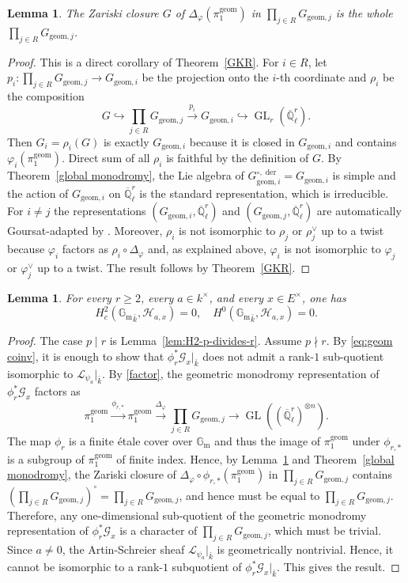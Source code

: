 \documentclass[11pt]{amsart}
\newtheorem{lemma}[theorem]{Lemma}
\theoremstyle{remark}
\newcommand{\Gm}{\mathbb G_{\mathrm m}}
\newcommand{\Ql}{\overline{\mathbb Q}_{\ell}}
\newcommand{\cL}{\mathcal L}
\newcommand{\cG}{\mathcal G}
\newcommand{\cH}{\mathcal H}
\newcommand{\geom}{\mathrm{geom}}
\def\GL{\operatorname{GL}}
\def\der{\operatorname{der}}
\begin{document}
\begin{lemma}\label{zariski closure}
The Zariski closure $G$ of $\Delta_\varphi(\pi_1^{\geom})$ in $\prod_{j\in R}G_{\geom,j}$ is the whole $\prod_{j\in R}G_{\geom,j}$.
\end{lemma}
\begin{proof}
This is a direct corollary of Theorem~\ref{GKR}. For $i\in R$, let $p_i:\prod_{j\in R}G_{\geom,j}\rightarrow G_{\geom,i}$ be the projection onto the $i$-th coordinate and $\rho_i$ be the composition
\[
G\hookrightarrow\prod_{j\in R}G_{\geom,j}\xrightarrow{p_i}G_{\geom,i}\hookrightarrow\GL_r(\Ql^r).
\]
Then $G_i=\rho_i(G)$ is exactly $G_{\geom,i}$ because it is closed in $G_{\geom,i}$ and contains $\varphi_i(\pi_1^{\geom})$. Direct sum of all $\rho_i$ is faithful by the definition of $G$. By Theorem~\ref{global monodromy}, the Lie algebra of $G_{\geom,i}^{\circ,\der}=G_{\geom,i}$ is simple and the action of $G_{\geom,i}$ on $\Ql^r$ is the standard representation, which is irreducible. For $i\ne j$ the representations $(G_{\geom,i},\Ql^r)$ and $(G_{\geom,j},\Ql^r)$ are automatically Goursat-adapted by \cite[Examples 1.8.1]{KatzESDE}. Moreover, $\rho_i$ is not isomorphic to $\rho_j$ or $\rho_j^\vee$ up to a twist because $\varphi_i$ factors as $\rho_i\circ\Delta_\varphi$ and, as explained above, $\varphi_i$ is not isomorphic to $\varphi_j$ or $\varphi_j^\vee$ up to a twist. The result follows by Theorem~\ref{GKR}. 
\end{proof}

\begin{lemma}\label{lem:H2-vanish}
For every $r\ge 2$, every $a\in k^{\times}$, and every $x\in E^{\times}$, one has
\[
H_c^2({\Gm}_{\bar{k}},\cH_{a,x})=0,\quad H^0({\Gm}_{\bar{k}},\cH_{a,x})=0.
\]
\end{lemma}

\begin{proof}
The case $p\mid r$ is Lemma~\ref{lem:H2-p-divides-r}.  Assume $p\nmid r$. By \eqref{eq:geom coinv}, it is enough to show that $\phi_{r}^*\cG_x|_{\bar{k}}$ does not admit a rank-$1$ sub-quotient isomorphic to $\cL_{\psi_a}|_{\bar{k}}$. By \eqref{factor}, the geometric monodromy representation of $\phi_{r}^*\cG_x$ factors as 
\[
\pi_1^{\geom}\xrightarrow{\phi_{r,*}}\pi_1^{\geom}\xrightarrow{\Delta_\varphi}\prod_{j\in R}G_{\geom,j}\longrightarrow\GL((\Ql^r)^{\otimes n}).
\]
The map $\phi_r$ is a finite \'etale cover over $\Gm$ and thus the image of $\pi_1^{\geom}$ under $\phi_{r,*}$ is a subgroup of $\pi_1^{\geom}$ of finite index. Hence, by Lemma~\ref{zariski closure} and Theorem~\ref{global monodromy}, the Zariski closure of $\Delta_\varphi\circ\phi_{r,*}(\pi_1^{\geom})$ in $\prod_{j\in R}G_{\geom,j}$ contains $(\prod_{j\in R}G_{\geom,j})^{\circ}=\prod_{j\in R}G_{\geom,j}$, and hence must be equal to $\prod_{j\in R}G_{\geom,j}$. Therefore, any one-dimensional sub-quotient of the geometric monodromy representation of $\phi_{r}^*\cG_x$ is a character of $\prod_{j\in R}G_{\geom,j}$, which must be trivial. Since $a\neq 0$, the Artin-Schreier sheaf $\cL_{\psi_a}|_{\bar{k}}$ is geometrically nontrivial. Hence, it cannot be isomorphic to a rank-$1$ subquotient of $\phi_r^*\cG_x|_{\bar{k}}$. This gives the result.
\end{proof}
\end{document}

